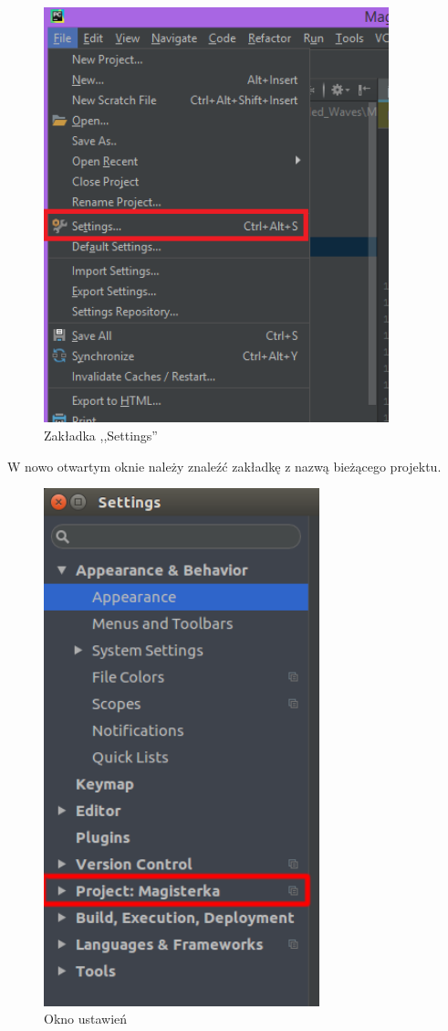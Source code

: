 \begin{figure}[h]
\centering
\includegraphics[width=10cm]{Zdjecia/5/kasia/settingsA}
\caption{Zakładka ,,Settings''}
\label{fig:file}
\end{figure}

W nowo otwartym oknie należy znaleźć zakładkę z nazwą bieżącego projektu.

\begin{figure}[h]
\centering
\includegraphics[width=8cm]{Zdjecia/5/kasia/settings2A}
\caption{Okno ustawień}
\label{fig:file}
\end{figure}

